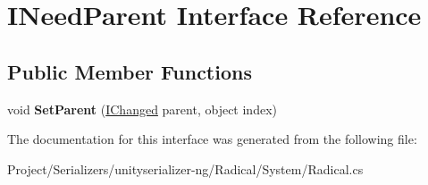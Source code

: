 \hypertarget{interface_i_need_parent}{}\section{I\+Need\+Parent Interface Reference}
\label{interface_i_need_parent}
\subsection*{Public Member Functions}
\begin{DoxyCompactItemize}
\item 
\mbox{\label{interface_i_need_parent_a5f0d3aafe8470eedf6039b3a6da82bec}} 
void {\bfseries Set\+Parent} (\hyperlink{interface_i_changed}{I\+Changed} parent, object index)
\end{DoxyCompactItemize}


The documentation for this interface was generated from the following file\+:\begin{DoxyCompactItemize}
\item 
Project/\+Serializers/unityserializer-\/ng/\+Radical/\+System/Radical.\+cs\end{DoxyCompactItemize}
